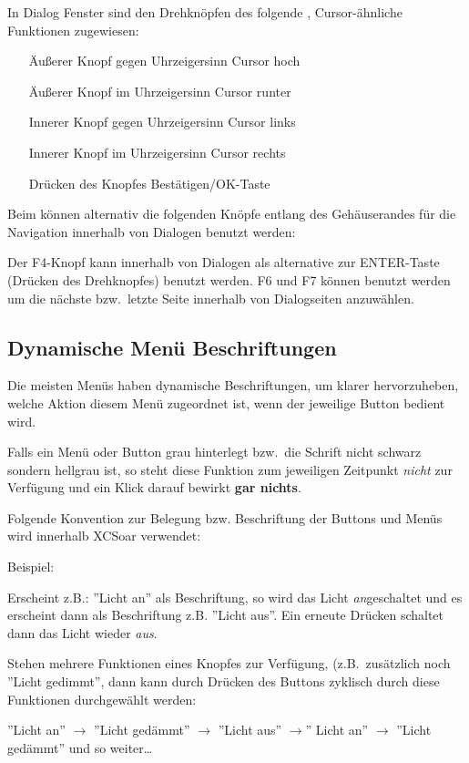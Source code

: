 In Dialog Fenster sind den Drehknöpfen des \al folgende , Cursor-ähnliche Funktionen zugewiesen:
\begin{itemize}
\item[Äußerer Knopf gegen Uhrzeigersinn       ] Cursor hoch
\item[Äußerer Knopf im Uhrzeigersinn             ] Cursor runter
\item[Innerer Knopf gegen Uhrzeigersinn        ] Cursor links
\item[Innerer Knopf im Uhrzeigersinn              ] Cursor rechts
\item[Drücken des Knopfes ] Bestätigen/OK-Taste
\end{itemize}

Beim \al können alternativ die folgenden Knöpfe entlang des Gehäuserandes für die Navigation innerhalb von Dialogen benutzt werden:

Der F4-Knopf kann innerhalb von Dialogen als alternative zur ENTER-Taste (Drücken des Drehknopfes) benutzt werden.
F6 und F7 können benutzt werden um die nächste bzw.\ letzte Seite innerhalb von Dialogseiten anzuwählen.
\subsection*{Dynamische Menü Beschriftungen}
Die meisten Menüs haben dynamische Beschriftungen, um klarer hervorzuheben, welche Aktion diesem Menü zugeordnet ist, wenn der jeweilige Button bedient wird.

Falls ein Menü oder Button grau hinterlegt bzw.\ die Schrift nicht schwarz sondern hellgrau ist, \textcolor{white}{} so steht diese Funktion zum jeweiligen Zeitpunkt \emph{nicht} zur Verfügung und ein Klick darauf bewirkt \textbf{gar nichts}. 

Folgende Konvention zur Belegung bzw. Beschriftung der Buttons und Menüs wird  innerhalb \textsf{XCSoar} verwendet:

Beispiel:

Erscheint z.B.:  ''Licht an'' als Beschriftung, so  wird das Licht \emph{an}geschaltet und  es erscheint dann als Beschriftung z.B. ''Licht aus''.  Ein erneute Drücken schaltet dann das Licht wieder \emph{aus}.

Stehen mehrere Funktionen eines Knopfes zur Verfügung, (z.B.\ zusätzlich noch ''Licht gedimmt'', dann kann durch Drücken des Buttons zyklisch durch diese Funktionen durchgewählt werden:


\begin{center}
''Licht an'' $\rightarrow$ ''Licht gedämmt'' $\rightarrow$ ''Licht aus'' $\rightarrow$'' Licht an'' $\rightarrow$ ''Licht gedämmt'' und so weiter\dots
\end{center}

